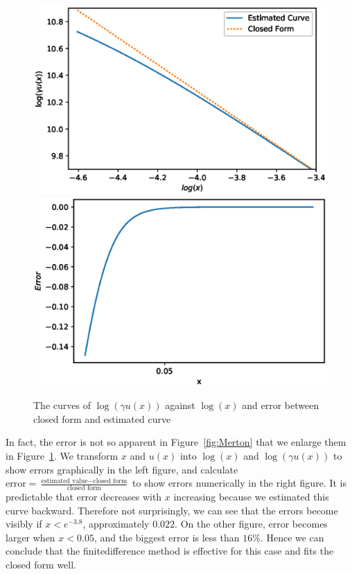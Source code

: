 \documentclass[a4paper]{article}
\theoremstyle{definition}
\numberwithin{equation}{section}
\begin{document}
\begin{figure}[H]
\centering
\includegraphics[scale=0.45]{MertonVlog.eps}
\includegraphics[scale=0.45]{MertonVerror.eps}
\caption{The curves of $\log(\gamma u(x))$ against $\log(x)$ and error between closed form and estimated curve}
\label{fig:MertonError}
\end{figure}
In fact, the error is not so apparent in Figure~\ref{fig:Merton} that we enlarge them in Figure~\ref{fig:MertonError}. We transform $x$ and $u(x)$ into $\log(x)$ and $\log(\gamma u(x))$ to show errors graphically in the left figure, and calculate $\text{error}=\frac{\text{estimated value}-\text{closed form}}{\text{closed form}}$ to show errors numerically in the right figure. It is predictable that error decreases with $x$ increasing because we estimated this curve backward. Therefore not surprisingly, we can see that the errors become visibly if $x<e^{-3.8}$, approximately $0.022$. On the other figure, error becomes larger when $x<0.05$, and the biggest error is less than $16\%$. Hence we can conclude that the finitedifference method is effective for this case and fits the closed form well.
\end{document}
